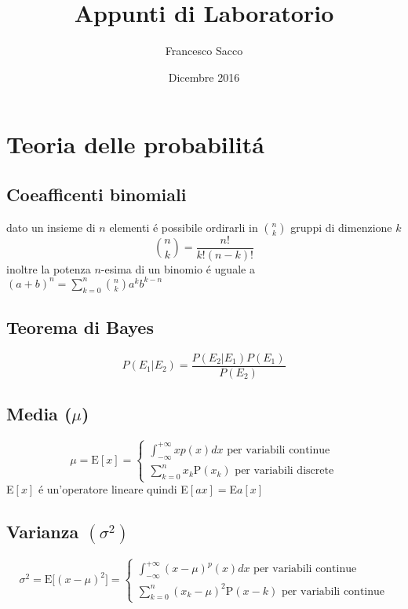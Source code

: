 \documentclass{exam}
\date{Dicembre 2016}
\title{Appunti di Laboratorio}
\author{Francesco Sacco}
\begin{document}
  \section{Teoria delle probabilit\'a}
    \subsection{Coeafficenti binomiali}
      dato un insieme di $n$ elementi \'e possibile ordirarli in 
      $\binom{n}{k}$ gruppi di dimenzione $k$
      \[ \binom{n}{k}=\frac{n!}{k!(n-k)!} \]
      inoltre la potenza $n$-esima di un binomio \'e uguale a 
      \(\displaystyle(a+b)^n=\sum_{k=0}^n \binom{n}{k}a^k b^{k-n} \)
      
    \subsection{Teorema di Bayes}
      \[P(E_{1}|E_{2})=\frac{P(E_{2}|E_{1})P(E_{1})}{P(E_{2})} \]
      
    \subsection{Media ($\mu$)}
      \begin{displaymath}
        \mu=\textrm{E}[x]=\begin{cases}
            \displaystyle \int_{-\infty}^{+\infty}xp(x)dx \textrm{ per variabili continue}\\
            \displaystyle \sum_{k=0}^{n}x_{k}\textrm{P}(x_{k})
            \textrm{ per variabili discrete}
          \end{cases}
      \end{displaymath}
      E$[x]$ \'e un'operatore lineare quindi E$[ax]=$E$a[x]$
       
     \subsection{Varianza $(\sigma^2)$}
       \[
         \sigma^2=\textrm{E}\bigr[(x-\mu)^2\bigr]=\begin{cases}
             \displaystyle \int_{-\infty}^{+\infty}(x-\mu)^p(x)dx 
             \textrm{ per variabili continue}\\
             \displaystyle \sum_{k=0}^{n}(x_{k}-\mu)^2\textrm{P}(x-{k})
             \textrm { per variabili continue}
           \end{cases}
       \]
\end{document}

